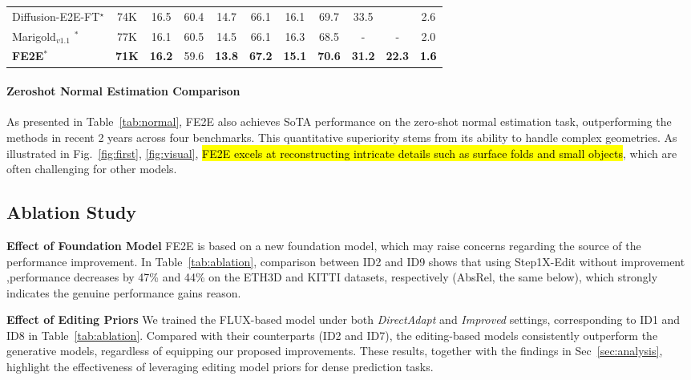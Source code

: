 \documentclass{article} %
\begin{document}
\begin{table}[!ht]
{\begin{tabular}{l|c|cc|cc|cc|cc|c}
Diffusion-E2E-FT$^{\star}$
& 74K& 16.5 & \cellcolor{best2}60.4& {14.7} & \cellcolor{best2}66.1& \cellcolor{best2}16.1 &\cellcolor{best2}69.7&33.5 & \cellcolor{best2}{22.3} & 2.6  \\


Marigold$_{v1.1}$ $^\ast$ 
&77K & \cellcolor{best} {16.1}& \cellcolor{best}60.5& \cellcolor{best2}14.5&  \cellcolor{best2}66.1&  16.3& 68.5& -& -& \cellcolor{best2}2.0  \\

\textbf{FE2E}$^\ast$
&\cellcolor{best2}\textbf{71K}&  \cellcolor{best2}\textbf{16.2}&  59.6& \cellcolor{best}\textbf{13.8}&\cellcolor{best}  \textbf{67.2}&  \cellcolor{best}\textbf{15.1}&\cellcolor{best}  \textbf{70.6}&  \cellcolor{best}\textbf{31.2}& \cellcolor{best2}\textbf{ 22.3}& \textcolor{black}{\cellcolor{best}\textbf{1.6}}   \\
  
  \bottomrule
  \end{tabular}
  }
\vspace{-1.5em}
\end{table}

\paragraph{Zeroshot Normal Estimation Comparison}
As presented in Table~\ref{tab:normal}, FE2E also achieves SoTA performance on the zero-shot normal estimation task, outperforming the methods in recent 2 years across four benchmarks. This quantitative superiority stems from its ability to handle complex geometries. As illustrated in Fig.~\ref{fig:first}, \ref{fig:visual}, \hl{FE2E excels at reconstructing intricate details such as surface folds and small objects}, which are often challenging for other models.
\subsection{Ablation Study}
\label{sec:ablation}
\textbf{Effect of Foundation Model}
FE2E is based on a new foundation model, which may raise concerns regarding the source of the performance improvement. In Table~\ref{tab:ablation}, comparison between ID2 and ID9 shows that using Step1X-Edit without improvement ,performance decreases by 47\% and 44\% on the ETH3D and KITTI datasets, respectively (AbsRel, the same below), which strongly indicates the genuine performance gains reason.

\textbf{Effect of Editing Priors}
We trained the FLUX-based model under both \textit{DirectAdapt} and \textit{Improved} settings, corresponding to ID1 and ID8 in Table~\ref{tab:ablation}. Compared with their counterparts (ID2 and ID7), the editing-based models consistently outperform the generative models, regardless of equipping our proposed improvements. These results, together with the findings in Sec~\ref{sec:analysis}, highlight the effectiveness of leveraging editing model priors for dense prediction tasks.
\end{document}
